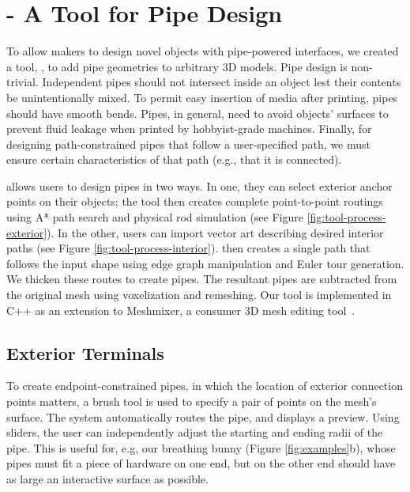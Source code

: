\section{\systemname - A Tool for Pipe Design}
To allow makers to design novel objects with pipe-powered interfaces, we created a tool, \systemnamenospace, to add pipe geometries to arbitrary 3D models. Pipe design is non-trivial.  Independent pipes should not intersect inside an object lest their contents be unintentionally mixed.  To permit easy insertion of media after printing, pipes should have smooth bends.  Pipes, in general, need to avoid objects' surfaces to prevent fluid leakage when printed by hobbyist-grade machines.  Finally, for designing path-constrained pipes that follow a user-specified path, we must ensure certain characteristics of that path (e.g., that it is connected). 

\systemname allows users to design pipes in two ways. In one, they can select exterior anchor points on their objects; the tool then creates complete point-to-point routings using A* path search and physical rod simulation (see Figure \ref{fig:tool-process-exterior}). In the other, users can import vector art describing desired interior paths (see Figure \ref{fig:tool-process-interior}).  \systemname then creates a single path that follows the input shape using edge graph manipulation and Euler tour generation.  We thicken these routes to create pipes.  The resultant pipes are subtracted from the original mesh using voxelization and remeshing. Our tool is implemented in C++ as an extension to Meshmixer, a consumer 3D mesh editing tool~\cite{Schmidt-meshmixer}.

\subsection{Exterior Terminals}

To create endpoint-constrained pipes, in which the location of exterior connection points matters, a brush tool is used to specify a pair of points on the mesh's surface. The system automatically routes the pipe, and displays a preview.  Using sliders, the user can independently adjust the starting and ending radii of the pipe.  This is useful for, e.g, our breathing bunny (Figure \ref{fig:examples}b), whose pipes must fit a piece of hardware on one end, but on the other end should have as large an interactive surface as possible.

